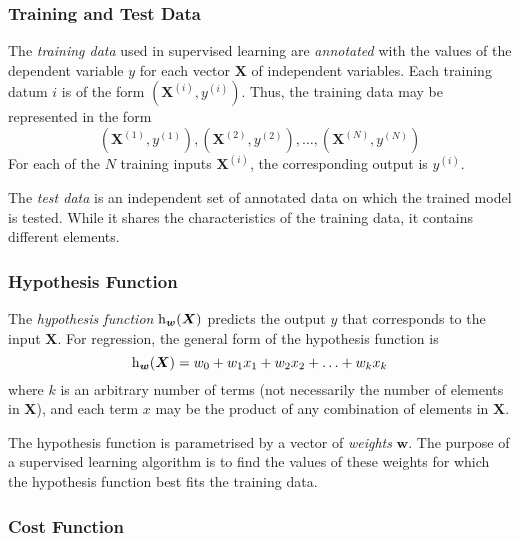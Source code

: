 \subsubsection{Training and Test Data}

The \emph{training data} used in supervised learning are \emph{annotated} with the values of the dependent variable \( y \) for each vector \( \boldsymbol{X} \) of independent variables.
Each training datum \( i \) is of the form \( \left( \boldsymbol{X}^{(i)}, y^{(i)} \right) \).
Thus, the training data may be represented in the form
\begin{equation*}
  \left( \boldsymbol{X}^{(1)}, y^{(1)} \right), \left( \boldsymbol{X}^{(2)}, y^{(2)} \right), \ldots, \left( \boldsymbol{X}^{(N)}, y^{(N)} \right)
\end{equation*}
For each of the \( N \) training inputs \( \boldsymbol{X}^{(i)} \), the corresponding output is \( y^{(i)} \).

The \emph{test data} is an independent set of annotated data on which the trained model is tested.
While it shares the characteristics of the training data, it contains different elements.

\subsubsection{Hypothesis Function}

The \emph{hypothesis function} \( \function[_{\boldsymbol{w}}]{h}{\boldsymbol{X}} \) predicts the output \( y \) that corresponds to the input \( \boldsymbol{X} \)\@.
For regression, the general form of the hypothesis function is
\begin{equation*}
  \function[_{\boldsymbol{w}}]{h}{\boldsymbol{X}} = w_0 + w_1 x_1 + w_2 x_2 + \ldots +  w_k x_k
\end{equation*}
where \( k \) is an arbitrary number of terms (not necessarily the number of elements in \( \boldsymbol{X} \)), and each term \( x \) may be the product of any combination of elements in \( \boldsymbol{X} \)\@.

The hypothesis function is parametrised by a vector of \emph{weights} \( \boldsymbol{w} \).
The purpose of a supervised learning algorithm is to find the values of these weights for which the hypothesis function best fits the training data.

\subsubsection{Cost Function}

